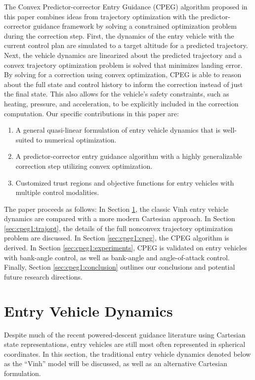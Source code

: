 The Convex Predictor-corrector Entry Guidance (CPEG) algorithm proposed in this paper combines ideas from trajectory optimization with the predictor-corrector guidance framework by solving a constrained optimization problem during the correction step.  First, the dynamics of the entry vehicle with the current control plan are simulated to a target altitude for a predicted trajectory. Next, the vehicle dynamics are linearized about the predicted trajectory and a convex trajectory optimization problem is solved that minimizes landing error. By solving for a correction using convex optimization, CPEG is able to reason about the full state and control history to inform the correction instead of just the final state.  This also allows for the vehicle's safety constraints, such as heating, pressure, and acceleration, to be explicitly included in the correction computation. Our specific contributions in this paper are:
\begin{enumerate}
    \item A general quasi-linear formulation of entry vehicle dynamics that is well-suited to numerical optimization.
    \vspace{8pt}
    \item A predictor-corrector entry guidance algorithm with a highly generalizable correction step utilizing convex optimization.
    \vspace{8pt}
    \item Customized trust regions and objective functions for entry vehicles with multiple control modalities. 
\end{enumerate}

The paper proceeds as follows: In Section \ref{sec:cpeg1:dynamics}, the classic Vinh entry vehicle dynamics are compared with a more modern Cartesian approach. In Section \ref{sec:cpeg1:trajopt}, the details of the full nonconvex trajectory optimization problem are discussed. In Section \ref{sec:cpeg1:cpeg}, the CPEG algorithm is derived. In Section \ref{sec:cpeg1:experiments}, CPEG is validated on entry vehicles with bank-angle control, as well as bank-angle and angle-of-attack control. Finally, Section \ref{sec:cpeg1:conclusion} outlines our conclusions and potential future research directions.


\section{Entry Vehicle Dynamics}
\label{sec:cpeg1:dynamics}

Despite much of the recent powered-descent guidance literature using Cartesian state representations, entry vehicles are still most often represented in spherical coordinates. In this section, the traditional entry vehicle dynamics denoted below as the ``Vinh'' model will be discussed, as well as an alternative Cartesian formulation. 


